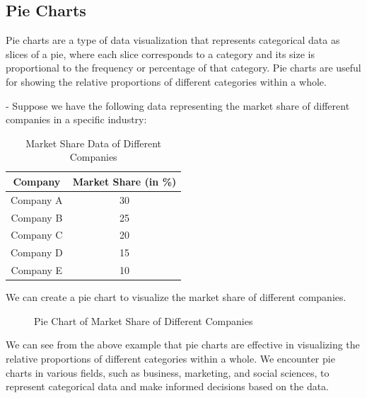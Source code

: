 \documentclass[openany]{book}
\begin{document}
\subsection{Pie Charts}
Pie charts are a type of data visualization that represents categorical data as slices of a pie, where each slice corresponds to a category and its size is proportional to the frequency or percentage of that category. Pie charts are useful for showing the relative proportions of different categories within a whole. \\
\begin{example}
 - Suppose we have the following data representing the market share of different companies in a specific industry:
\begin{table}[H]
    \centering
    \begin{tabular}{|c|c|}
        \hline
        \textbf{Company} & \textbf{Market Share (in \%)} \\
        \hline
        Company A & 30 \\
        Company B & 25 \\
        Company C & 20 \\
        Company D & 15 \\
        Company E & 10 \\
        \hline
    \end{tabular}
    \caption{Market Share Data of Different Companies}
\end{table}
We can create a pie chart to visualize the market share of different companies. \\
\begin{figure}[H]
    \centering
    \caption{Pie Chart of Market Share of Different Companies}
\end{figure}
\end{example}
We can see from the above example that pie charts are effective in visualizing the relative proportions of different categories within a whole. We encounter pie charts in various fields, such as business, marketing, and social sciences, to represent categorical data and make informed decisions based on the data. 
\end{document}
